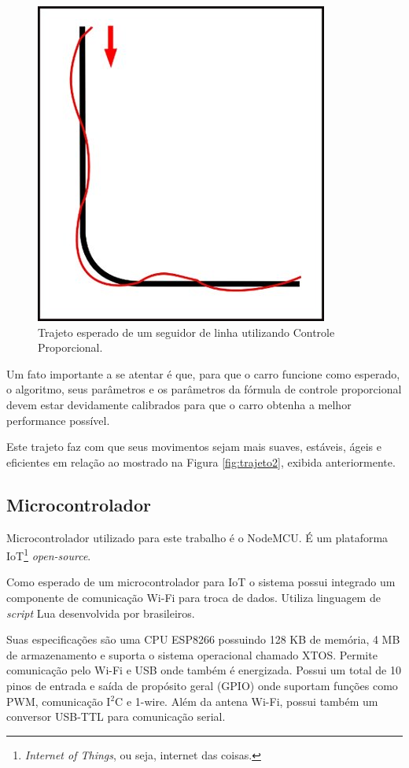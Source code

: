 \documentclass[portugues, brazil, a4paper,12pt]{article}
\begin{document}
				\begin{figure}[H]
					\centering
					\includegraphics[width=0.5\linewidth]{img/elementos-trajeto3.jpg}
					\caption{Trajeto esperado de um seguidor de linha utilizando Controle Proporcional.}
					\label{fig:trajeto3}
				\end{figure}

				Um fato importante a se atentar é que, para que o carro funcione como esperado, o algoritmo, seus parâmetros e os parâmetros da fórmula de controle proporcional devem estar devidamente calibrados para que o carro obtenha a melhor performance possível.

				Este trajeto faz com que seus movimentos sejam mais suaves, estáveis, ágeis e eficientes em relação ao mostrado na Figura \ref{fig:trajeto2}, exibida anteriormente.


	\subsection{Microcontrolador}
		Microcontrolador utilizado para este trabalho é o NodeMCU. É um plataforma IoT\footnote{\textit{Internet of Things}, ou seja, internet das coisas.} \textit{open-source}.

		Como esperado de um microcontrolador para IoT o sistema possui integrado um componente de comunicação Wi-Fi para troca de dados. Utiliza linguagem de \textit{script} Lua desenvolvida por brasileiros.

		Suas especificações são uma CPU ESP8266 possuindo 128 KB de memória, 4 MB de armazenamento e suporta o sistema operacional chamado XTOS. Permite comunicação pelo Wi-Fi e USB onde também é energizada. Possui um total de 10 pinos de entrada e saída de propósito geral (GPIO) onde suportam funções como PWM, comunicação I$ ^2 $C e 1-wire. Além da antena Wi-Fi, possui também um conversor USB-TTL para comunicação serial.
\end{document}
